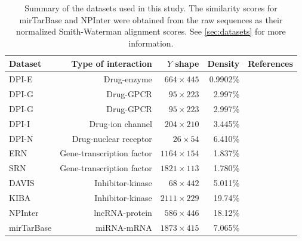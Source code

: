 \begin{table}[tb]
    \centering
    \caption{
        Summary of the datasets used in this study. The similarity scores for mirTarBase and NPInter were obtained from the raw sequences as their normalized Smith-Waterman alignment scores. See \autoref{sec:datasets} for more information.
    }
    \label{tab:datasets}
    \begin{tabular}{lrrrr}
        \toprule
        Dataset & Type of interaction & $Y$ shape & Density & References\\
        \midrule
        DPI-E & Drug-enzyme & $664 \times 445$ & 0.9902\% &\cite{yamanishi2008prediction}\\
        DPI-G & Drug-GPCR & $95 \times 223$ & 2.997\% &\cite{yamanishi2008prediction}\\
        DPI-G & Drug-GPCR & $95 \times 223$ & 2.997\% &\cite{yamanishi2008prediction}\\
        DPI-I & Drug-ion channel & $204 \times 210$ & 3.445\% &\cite{yamanishi2008prediction}\\
        DPI-N & Drug-nuclear receptor & $26 \times 54$ & 6.410\% &\cite{yamanishi2008prediction}\\
        ERN & Gene-transcription factor & $1164 \times 154$ & 1.837\% &\cite{faith2007largescale}\\
        SRN & Gene-transcription factor & $1821 \times 113$ & 1.780\% & \cite{macisaac2006improved, hughes2000functional, hu2007genetic, chua2006identifying, schrynemackers2015classifying}\\
        DAVIS & Inhibitor-kinase & $68 \times 442$ & 5.011\% &\cite{davis2011comprehensive,he2017simboost,huang2020deeppurpose}\\
        KIBA & Inhibitor-kinase & $2111 \times 229$ & 19.74\% &\cite{tang2014making,he2017simboost,huang2020deeppurpose}\\
        NPInter & lncRNA-protein & $586 \times 446$ & 18.12\% &\cite{wu2006npinter, teng2020npinter}\\
        mirTarBase & miRNA-mRNA & $1873 \times 415$ & 7.065\% &\cite{hsu2011mirtarbase, huang2022mirtarbase}\\
        \bottomrule
    \end{tabular}
    \newline {}
\end{table}


